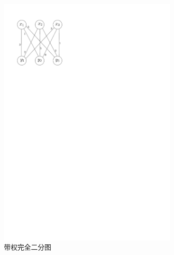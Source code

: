 \documentclass[a4paper]{ctexbook}
\begin{document}
  \begin{figure}
    \centering
    \begin{subfigure}[t]{0.45\linewidth}
      \centering
      \includegraphics[scale=0.8]{figures/weighted-bipartite}
      \caption{带权完全二分图}
    \end{subfigure}
    \begin{subfigure}[t]{0.45\linewidth}
      \centering

\end{subfigure}
\end{figure}
\end{document}
